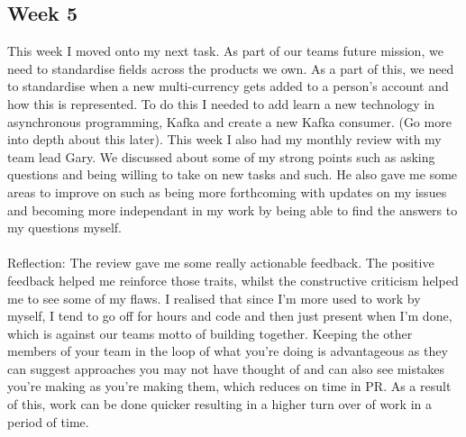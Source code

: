 \documentclass[11pt]{article} %
\begin{document}
\subsection{Week 5}
This week I moved onto my next task. As part of our teams future mission, we need to standardise fields across the products we own. As a part of this, we need to standardise when a new multi-currency gets added to a person's account and how this is represented. To do this I needed to add learn a new technology in asynchronous programming, Kafka and create a new Kafka consumer. (Go more into depth about this later). This week I also had my monthly review with my team lead Gary. We discussed about some of my strong points such as asking questions and being willing to take on new tasks and such. He also gave me some areas to improve on such as being more forthcoming with updates on my issues and becoming more independant in my work by being able to find the answers to my questions myself.
\\\\
Reflection: The review gave me some really actionable feedback. The positive feedback helped me reinforce those traits, whilst the constructive criticism helped me to see some of my flaws. I realised that since I'm more used to work by myself, I tend to go off for hours and code and then just present when I'm done, which is against our teams motto of building together. Keeping the other members of your team in the loop of what you're doing is advantageous as they can suggest approaches you may not have thought of and can also see mistakes you're making as you're making them, which reduces on time in PR. As a result of this, work can be done quicker resulting in a higher turn over of work in a period of time.
\end{document}
